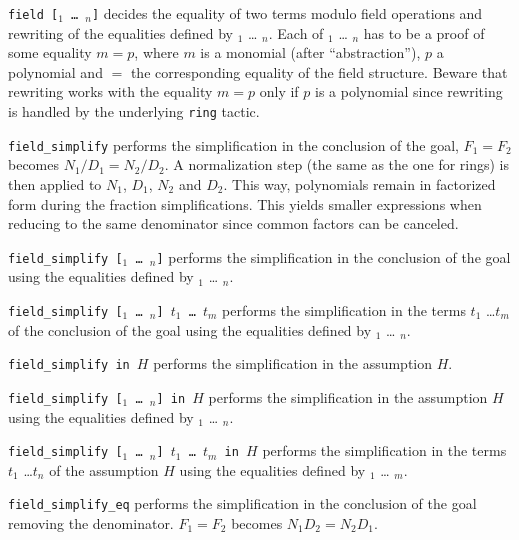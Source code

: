 \begin{Variants}
  \item {\tt field [\term$_1$ {\ldots} \term$_n$]} decides the equality of two
    terms modulo field operations and rewriting of the equalities
    defined by \term$_1$ {\ldots} \term$_n$. Each of \term$_1$
    {\ldots} \term$_n$ has to be a proof of some equality $m = p$,
    where $m$ is a monomial (after ``abstraction''),
    $p$ a polynomial and $=$ the corresponding equality of the field structure.
    Beware that rewriting works with the equality $m=p$ only if $p$ is a
    polynomial since rewriting is handled by the underlying {\tt ring}
    tactic.
  \item {\tt field\_simplify}
     performs the simplification in the conclusion of the goal, $F_1 = F_2$
     becomes $N_1/D_1 = N_2/D_2$. A normalization step (the same as the
     one for rings) is then applied to $N_1$, $D_1$, $N_2$ and
     $D_2$. This way, polynomials remain in factorized form during the
     fraction simplifications. This yields smaller expressions when
     reducing to the same denominator since common factors can be
     canceled.

  \item {\tt field\_simplify   [\term$_1$ {\ldots} \term$_n$]}
     performs the simplification in the conclusion of the goal using
    the equalities
    defined by \term$_1$ {\ldots} \term$_n$.

  \item {\tt field\_simplify   [\term$_1$ {\ldots} \term$_n$] $t_1$ \ldots
$t_m$}
     performs the simplification in the terms $t_1$ \ldots $t_m$
    of the conclusion of the goal using
    the equalities
    defined by \term$_1$ {\ldots} \term$_n$.

  \item {\tt field\_simplify in $H$}
     performs the simplification in the assumption $H$.

  \item {\tt field\_simplify   [\term$_1$ {\ldots} \term$_n$] in $H$}
     performs the simplification in the assumption $H$ using
    the equalities
    defined by \term$_1$ {\ldots} \term$_n$.

  \item {\tt field\_simplify   [\term$_1$ {\ldots} \term$_n$] $t_1$ \ldots
$t_m$ in $H$}
     performs the simplification in the terms $t_1$ \ldots $t_n$
    of the assumption $H$ using
    the equalities
    defined by \term$_1$ {\ldots} \term$_m$.

  \item {\tt field\_simplify\_eq}
     performs the simplification in the conclusion of the goal removing
     the denominator. $F_1 = F_2$
     becomes $N_1 D_2 = N_2  D_1$.


\end{Variants}
